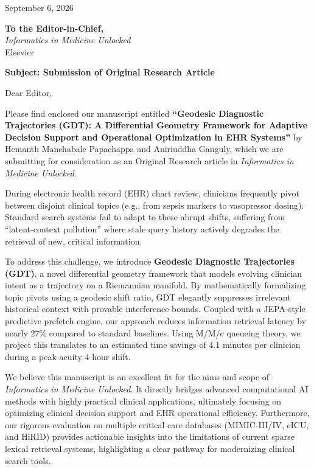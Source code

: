 \documentclass[11pt]{article}
\begin{document}
\thispagestyle{empty}

\begin{flushright}
September 6, 2026
\end{flushright}

\vspace{1em}
\noindent
\textbf{To the Editor-in-Chief,}\\
\textit{Informatics in Medicine Unlocked}\\
Elsevier

\vspace{1.5em}
\noindent
\textbf{Subject: Submission of Original Research Article}

\vspace{1.5em}
\noindent
Dear Editor,

\vspace{1em}
\noindent
Please find enclosed our manuscript entitled \textbf{``Geodesic Diagnostic Trajectories (GDT): A Differential Geometry Framework for Adaptive Decision Support and Operational Optimization in EHR Systems''} by Hemanth Manchabale Papachappa and Aniriuddha Ganguly, which we are submitting for consideration as an Original Research article in \textit{Informatics in Medicine Unlocked}.

\vspace{1em}
\noindent
During electronic health record (EHR) chart review, clinicians frequently pivot between disjoint clinical topics (e.g., from sepsis markers to vasopressor dosing). Standard search systems fail to adapt to these abrupt shifts, suffering from ``latent-context pollution'' where stale query history actively degrades the retrieval of new, critical information. 

\vspace{1em}
\noindent
To address this challenge, we introduce \textbf{Geodesic Diagnostic Trajectories (GDT)}, a novel differential geometry framework that models evolving clinician intent as a trajectory on a Riemannian manifold. By mathematically formalizing topic pivots using a geodesic shift ratio, GDT elegantly suppresses irrelevant historical context with provable interference bounds. Coupled with a JEPA-style predictive prefetch engine, our approach reduces information retrieval latency by nearly 27\% compared to standard baselines. Using M/M/c queueing theory, we project this translates to an estimated time savings of 4.1 minutes per clinician during a peak-acuity 4-hour shift. 

\vspace{1em}
\noindent
We believe this manuscript is an excellent fit for the aims and scope of \textit{Informatics in Medicine Unlocked}. It directly bridges advanced computational AI methods with highly practical clinical applications, ultimately focusing on optimizing clinical decision support and EHR operational efficiency. Furthermore, our rigorous evaluation on multiple critical care databases (MIMIC-III/IV, eICU, and HiRID) provides actionable insights into the limitations of current sparse lexical retrieval systems, highlighting a clear pathway for modernizing clinical search tools.
\end{document}
